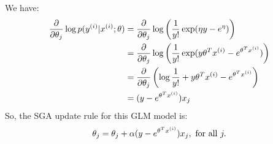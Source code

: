 \begin{answer}
We have:
\begin{align}
	\frac{\partial}{\partial \theta_j} \log p(y^{(i)}|x^{(i)}; \theta) 
	&= \frac{\partial}{\partial \theta_j} \log \left( \frac{1}{y!} \exp (\eta y - e^{\eta}) \right) \\
	&= \frac{\partial}{\partial \theta_j} \log \left( \frac{1}{y!} \exp (y \theta^Tx^{(i)} - e^{\theta^Tx^{(i)}}) \right) \\
	&= \frac{\partial}{\partial \theta_j} \left( \log \frac{1}{y!} + y \theta^Tx^{(i)} - e^{\theta^Tx^{(i)}} \right) \\
	&= (y - e^{\theta^Tx^{(i)}}) x_j
\end{align}
So, the SGA update rule for this GLM model is:
$$ \theta_j = \theta_j + \alpha (y - e^{\theta^Tx^{(i)}}) x_j, \text{ for all } j. $$
\end{answer}
